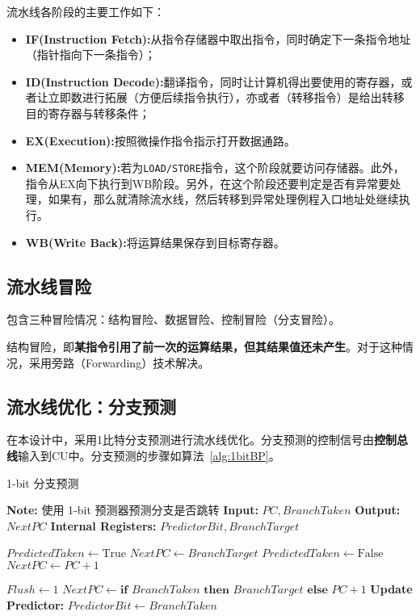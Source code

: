 \documentclass[lang=cn,a4paper,newtx]{elegantpaper}
\begin{document}
流水线各阶段的主要工作如下：
\begin{itemize}
  \item \textbf{IF(Instruction Fetch):}从指令存储器中取出指令，同时确定下一条指令地址（指针指向下一条指令）；
  \item \textbf{ID(Instruction Decode):}翻译指令，同时让计算机得出要使用的寄存器，或者让立即数进行拓展（方便后续指令执行），亦或者（转移指令）是给出转移目的寄存器与转移条件；
  \item \textbf{EX(Execution):}按照微操作指令指示打开数据通路。
  \item \textbf{MEM(Memory):}若为\texttt{LOAD/STORE}指令，这个阶段就要访问存储器。此外，指令从EX向下执行到WB阶段。另外，在这个阶段还要判定是否有异常要处理，如果有，那么就清除流水线，然后转移到异常处理例程入口地址处继续执行。
  \item \textbf{WB(Write Back):}将运算结果保存到目标寄存器。
\end{itemize}

\subsection{流水线冒险}
包含三种冒险情况：结构冒险、数据冒险、控制冒险（分支冒险）。\cite{zhihu453232311}

结构冒险，即\textbf{某指令引用了前一次的运算结果，但其结果值还未产生}。对于这种情况，采用旁路（Forwarding）技术解决。
\subsection{流水线优化：分支预测}
在本设计中，采用1比特分支预测进行流水线优化。分支预测的控制信号由\textbf{控制总线}输入到CU中。分支预测的步骤如算法~\ref{alg:1bitBP}。

\begin{algorithm}[htbp]
  \caption{1-bit 分支预测}
  \label{alg:1bitBP}
  \begin{algorithmic}[1]
  \State \textbf{Note:} 使用 1-bit 预测器预测分支是否跳转
  \State \textbf{Input:} $PC, BranchTaken$
  \State \textbf{Output:} $NextPC$
  \State \textbf{Internal Registers:} $PredictorBit, BranchTarget$

          \State $PredictedTaken \gets \text{True}$
          \State $NextPC \gets BranchTarget$
      \Else
          \State $PredictedTaken \gets \text{False}$
          \State $NextPC \gets PC + 1$
      \EndIf
  \EndProcedure

        
          \State $Flush \gets 1$  
          \State $NextPC \gets \textbf{if } BranchTaken \textbf{ then } BranchTarget \textbf{ else } PC + 1$
      \EndIf
      \State \textbf{Update Predictor:}
      \State $PredictorBit \gets BranchTaken$  
  \EndProcedure
  \end{algorithmic}
\end{algorithm}
\end{document}
